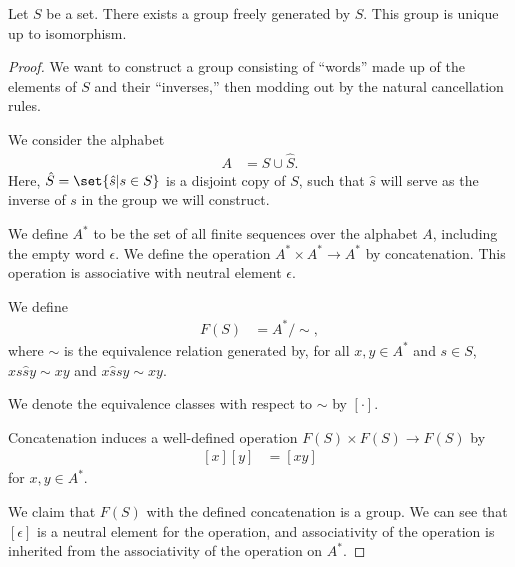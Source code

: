 \documentclass[10pt]{mypackage}
\begin{document}
\begin{theorem}
  Let $S$ be a set. There exists a group freely generated by $S$. This group is unique up to isomorphism.
\end{theorem}
\begin{proof}
  We want to construct a group consisting of ``words'' made up of the elements of $S$ and their ``inverses,'' then modding out by the natural cancellation rules.\newline

  We consider the alphabet
  \begin{align*}
    A &= S\cup \hat{S}.
  \end{align*}
  Here, $\hat{S} = \set{\hat{s} | s\in S}$ is a disjoint copy of $S$, such that $\hat{s}$ will serve as the inverse of $s$ in the group we will construct.\newline

  We define $A^{\ast}$ to be the set of all finite sequences over the alphabet $A$, including the empty word $\epsilon$. We define the operation $A^{\ast}\times A^{\ast} \rightarrow A^{\ast}$ by concatenation. This operation is associative with neutral element $\epsilon$.\newline

  We define
  \begin{align*}
    F(S) &= A^{\ast}/\sim,
  \end{align*}
  where $\sim$ is the equivalence relation generated by, for all $x,y\in A^{\ast}$ and $s\in S$, $x s \hat{s} y \sim xy$ and $x\hat{s} s y \sim xy$.\newline

  We denote the equivalence classes with respect to $\sim$ by $\left[\cdot\right]$.\newline

  Concatenation induces a well-defined operation $F\left(S\right)\times F\left(S\right) \rightarrow F(S)$ by
  \begin{align*}
    \left[x\right] \left[y\right] &= \left[xy\right]
  \end{align*}
  for $x,y\in A^{\ast}$.\newline

  We claim that $F(S)$ with the defined concatenation is a group. We can see that $\left[\epsilon\right]$ is a neutral element for the operation, and associativity of the operation is inherited from the associativity of the operation on $A^{\ast}$.\newline


\end{proof}
\end{document}
